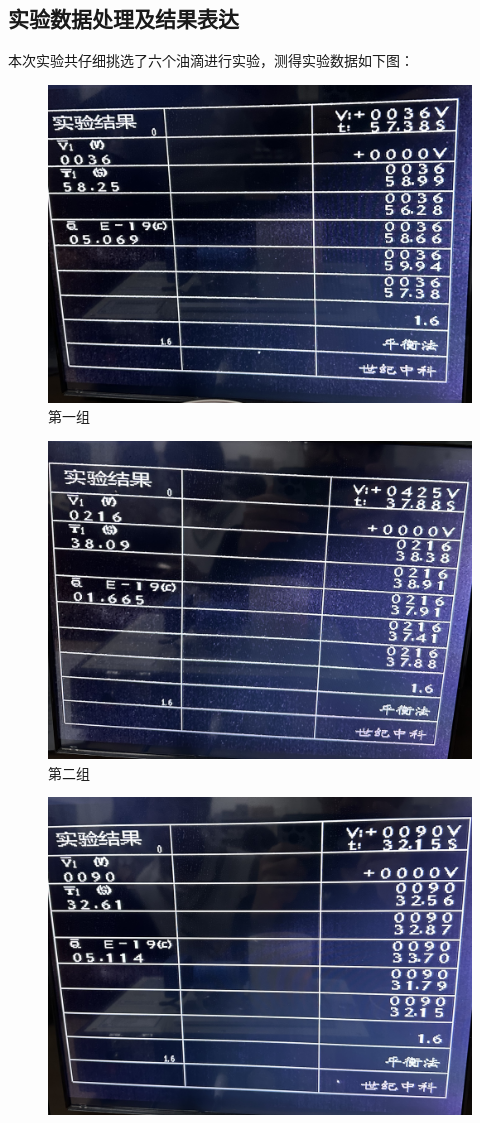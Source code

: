 \documentclass{WHUReport}
\begin{document}
\begin{multicols}{2}
	\section{实验数据处理及结果表达}
	本次实验共仔细挑选了六个油滴进行实验，测得实验数据如下图：
	\begin{figure}[H]
		\centering
		\includegraphics[width=0.8\linewidth]{figs/1.jpg}
		\caption{第一组}
	\end{figure}
	\begin{figure}[H]
		\centering
		\includegraphics[width=0.8\linewidth]{figs/2.jpg}
		\caption{第二组}
	\end{figure}
	\begin{figure}[H]
		\centering
		\includegraphics[width=0.8\linewidth]{figs/3.jpg}

\end{figure}
\end{multicols}
\end{document}
